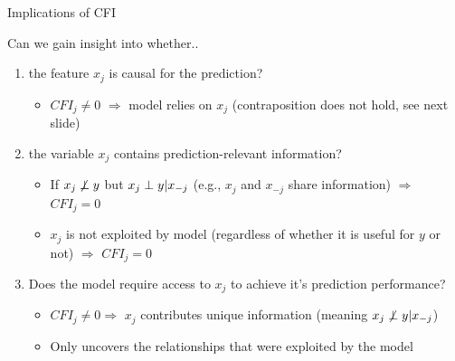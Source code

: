 \documentclass[11pt,compress,t,notes=noshow, aspectratio=169, xcolor=table]{beamer}
\begin{document}
\begin{frame}{Implications of CFI}

Can we gain insight into whether..

\begin{enumerate}
    \item<1-3> the feature $x_j$ is causal for the prediction?
    \begin{itemize}
      \item $CFI_j \neq 0$ $\Rightarrow$ model relies on $x_j$ (contraposition does not hold, see next slide)
    \end{itemize}
    \item<2-3> the variable $x_j$ contains prediction-relevant information?
    \begin{itemize}
      \item If $x_j \not \indep y$ but $x_j \indep y | x_{-j}$ (e.g., $x_j$ and $x_{-j}$ share information) $\Rightarrow$ $CFI_j = 0$
      \item  $x_{j}$ is not exploited by model (regardless of whether it is useful for $y$ or not) $\Rightarrow$ $CFI_j = 0$
    \end{itemize}
    \item<3> Does the model require access to $x_j$ to achieve it's prediction performance?
\begin{itemize}
      \item $CFI_j \neq 0 \Rightarrow$ $x_j$ contributes unique information (meaning $x_j \not \indep y | x_{-j}$)
      \item Only uncovers the relationships that were exploited by the model
    \end{itemize}
\end{enumerate}
\end{frame}
\end{document}
